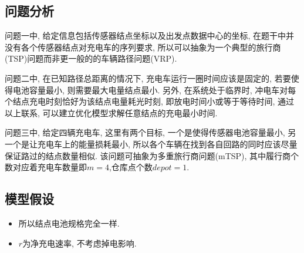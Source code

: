 	
	







	\subsection{问题分析}
		
		问题一中, 给定信息包括传感器结点坐标以及出发点数据中心的坐标, 在题干中并没有各个传感器结点对充电车的序列要求, 所以可以抽象为一个典型的旅行商(TSP)问题而非更一般的的车辆路径问题(VRP).

		问题二中, 在已知路径总距离的情况下, 充电车运行一圈时间应该是固定的, 若要使得电池容量最小, 则需要最大电量结点最小. 另外, 在系统处于临界时, 冲电车对每个结点充电时刻恰好为该结点电量耗光时刻, 即放电时间小或等于等待时间, 通过以上联系, 可以建立优化模型求解任意结点的充电最小时间.

		问题三中, 给定四辆充电车, 这里有两个目标, 一个是使得传感器电池容量最小, 另一个是让充电车上的能量损耗最小, 所以各个车辆在找到各自回路的同时应该尽量保证路过的结点数量相似. 该问题可抽象为多重旅行商问题(mTSP), 其中履行商个数对应着充电车数量即$m=4$,仓库点个数$depot= 1$.
		






		\subsection{模型假设}
		\begin{itemize}
			\item 所以结点电池规格完全一样.
			\item $r$为净充电速率, 不考虑掉电影响.
		\end{itemize}